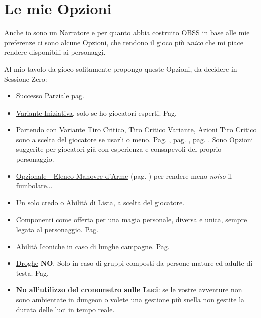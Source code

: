 \section{Le mie Opzioni}

\normalsize

Anche io sono un Narratore e per quanto abbia costruito OBSS in base alle mie preferenze ci sono alcune Opzioni, che rendono il gioco più \emph{unico} che mi piace rendere disponibili ai personaggi.

Al mio tavolo da gioco solitamente propongo queste Opzioni, da decidere in Sessione Zero:

\begin{itemize}[leftmargin=*] \setlength{\itemsep}{0pt}

\item
\hyperlink{successoparziale}{Successo Parziale} pag. \pageref{successoparziale}

\item
\hyperlink{varianteiniziativa}{Variante Iniziativa}, solo se ho giocatori esperti. Pag. \pageref{varianteiniziativa}

\item
Partendo con \hyperlink{variantetiricritici}{Variante Tiro Critico}, \hyperlink{tirocriticovariante}{Tiro Critico Variante}, \hyperlink{OpzionaleAzioniTiroCritico}{Azioni Tiro Critico} sono a scelta del giocatore se usarli o meno. Pag. \pageref{tirocriticovariante}, pag. \pageref{OpzionaleAzioniTiroCritico}, pag. \pageref{variantetiricritici}. Sono Opzioni suggerite per giocatori già con esperienza e consapevoli del proprio personaggio.

\item \hyperlink{elencotalentiarmi}{Opzionale - Elenco Manovre d'Arme} (pag. \pageref{elencotalentiarmi}) per rendere meno \emph{noiso} il fumbolare...


\item
\hyperlink{Un solo credo}{Un solo credo} o \hyperlink{abilitadilista}{Abilità di Lista}, a scelta del giocatore.

\item
\hyperlink{componenticomeofferta}{Componenti come offerta} per una magia personale, diversa e unica, sempre legata al personaggio. Pag. \pageref{componenticomeofferta}

\item
\hyperlink{abilitaiconiche}{Abilità Iconiche} in caso di lunghe campagne. Pag. \pageref{abilitaiconiche}

\item
\hyperlink{droghe}{Droghe} \textbf{NO}. Solo in caso di gruppi composti da persone mature ed adulte di testa. Pag. \pageref{droghe}

\item
\textbf{No all'utilizzo del cronometro sulle Luci}: se le vostre avventure non sono ambientate in dungeon o volete una gestione più snella non gestite la durata delle luci in tempo reale.

\end{itemize}

